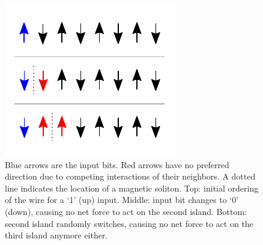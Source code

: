 \documentclass[11pt,a4paper,english]{article}
\begin{document}
\begin{figure}
    \centering
    \includegraphics[width=0.5\columnwidth]{Figures/Introduction/Soliton_random_walk_2steps.pdf}
    \caption{Blue arrows are the input bits. Red arrows have no preferred direction due to competing interactions of their neighbors. A dotted line indicates the location of a magnetic soliton. Top: initial ordering of the wire for a `1' (up) input. Middle: input bit changes to `0' (down), causing no net force to act on the second island. Bottom: second island randomly switches, causing no net force to act on the third island anymore either.}
    \label{fig:Intro_SolitonRandomWalk}
\end{figure}
\end{document}
